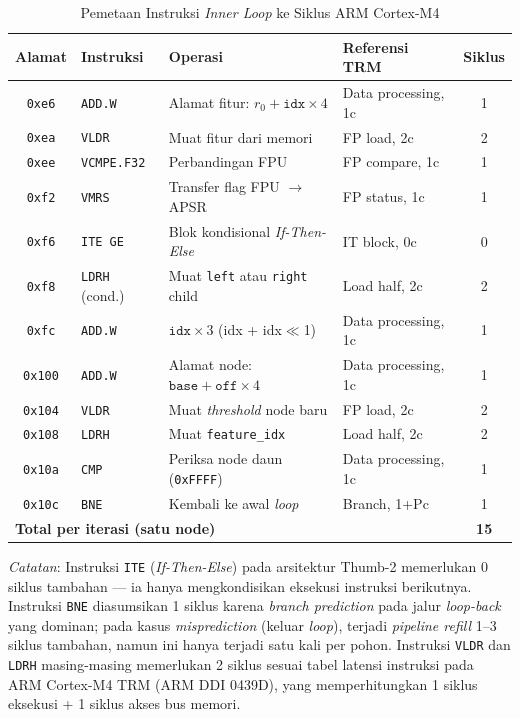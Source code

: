 \begin{enumerate}
\begin{table}[htbp]
\centering
\caption{Pemetaan Instruksi \textit{Inner Loop} ke Siklus ARM Cortex-M4}
\label{tab:arm_cycles}
\begin{tabular}{clllc}
\hline
\textbf{Alamat} & \textbf{Instruksi} & \textbf{Operasi} & \textbf{Referensi TRM} & \textbf{Siklus} \\
\hline
\texttt{0xe6} & \texttt{ADD.W} & Alamat fitur: $r_0 + \texttt{idx} \times 4$ & Data processing, 1c & 1 \\
\texttt{0xea} & \texttt{VLDR} & Muat fitur dari memori & FP load, 2c & 2 \\
\texttt{0xee} & \texttt{VCMPE.F32} & Perbandingan FPU & FP compare, 1c & 1 \\
\texttt{0xf2} & \texttt{VMRS} & Transfer flag FPU $\to$ APSR & FP status, 1c & 1 \\
\texttt{0xf6} & \texttt{ITE GE} & Blok kondisional \textit{If-Then-Else} & IT block, 0c & 0 \\
\texttt{0xf8} & \texttt{LDRH} (cond.) & Muat \texttt{left} atau \texttt{right} child & Load half, 2c & 2 \\
\texttt{0xfc} & \texttt{ADD.W} & $\texttt{idx} \times 3$ (idx + idx$\ll$1) & Data processing, 1c & 1 \\
\texttt{0x100} & \texttt{ADD.W} & Alamat node: $\texttt{base} + \texttt{off}\times 4$ & Data processing, 1c & 1 \\
\texttt{0x104} & \texttt{VLDR} & Muat \textit{threshold} node baru & FP load, 2c & 2 \\
\texttt{0x108} & \texttt{LDRH} & Muat \texttt{feature\_idx} & Load half, 2c & 2 \\
\texttt{0x10a} & \texttt{CMP} & Periksa node daun (\texttt{0xFFFF}) & Data processing, 1c & 1 \\
\texttt{0x10c} & \texttt{BNE} & Kembali ke awal \textit{loop} & Branch, 1+Pc & 1 \\
\hline
\multicolumn{4}{l}{\textbf{Total per iterasi (satu node)}} & \textbf{15} \\
\hline
\end{tabular}
\end{table}

    \textit{Catatan}: Instruksi \texttt{ITE} (\textit{If-Then-Else}) pada arsitektur Thumb-2 memerlukan 0 siklus tambahan --- ia hanya mengkondisikan eksekusi instruksi berikutnya. Instruksi \texttt{BNE} diasumsikan 1 siklus karena \textit{branch prediction} pada jalur \textit{loop-back} yang dominan; pada kasus \textit{misprediction} (keluar \textit{loop}), terjadi \textit{pipeline refill} 1--3 siklus tambahan, namun ini hanya terjadi satu kali per pohon. Instruksi \texttt{VLDR} dan \texttt{LDRH} masing-masing memerlukan 2 siklus sesuai tabel latensi instruksi pada ARM Cortex-M4 TRM (ARM DDI 0439D), yang memperhitungkan 1 siklus eksekusi + 1 siklus akses bus memori.


\end{enumerate}
